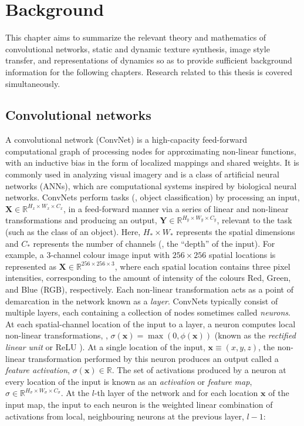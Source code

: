 \chapter{Background}\label{chap:background}

This chapter aims to summarize the relevant theory and mathematics of
convolutional networks,
static and dynamic texture synthesis, image style transfer, and representations of dynamics so as to provide sufficient
background information for the following chapters. Research
related to this thesis is covered simultaneously.

\section{Convolutional networks}

A convolutional network (ConvNet) is a high-capacity feed-forward computational graph of processing nodes for approximating non-linear functions, with an inductive bias in the form of localized mappings and shared weights. It is commonly used in analyzing visual imagery and is a class of artificial neural networks (ANNs), which are computational systems inspired by biological neural networks. ConvNets perform tasks (\eg, object classification) by processing an input, $\mathbf{X} \in \mathbb{R}^{H_x \times W_x \times C_x}$, in a feed-forward manner via a series of linear and non-linear transformations and producing an output, $\mathbf{Y} \in \mathbb{R}^{H_y \times W_y \times C_y}$, relevant to the task (such as the class of an object). Here, $H_\ast \times W_\ast$ represents the spatial dimensions and $C_\ast$ represents the number of channels (\ie, the ``depth'' of the input). For example, a $3$-channel colour image input with $256 \times 256$ spatial locations is represented as $\mathbf{X} \in \mathbb{R}^{256 \times 256 \times 3}$, where each spatial location contains three pixel intensities, corresponding to the amount of intensity of the colours Red, Green, and Blue (RGB), respectively. Each non-linear transformation acts as a point of demarcation in the network known as a \emph{layer}. ConvNets typically consist of multiple layers, each containing a collection of nodes sometimes called \emph{neurons}. At each spatial-channel location of the input to a layer, a neuron computes local non-linear transformations, \eg, $\sigma(\mathbf{x}) = \max{(0, \phi(\mathbf{x}))}$ (known as the \emph{rectified linear unit} or ReLU \cite{nair2010rectified}). At a single location of the input, $\mathbf{x} \equiv (x, y, z)$, the non-linear transformation performed by this neuron produces an output called a \emph{feature activation}, $\sigma(\mathbf{x}) \in \mathbb{R}$. The set of activations produced by a neuron at every location of the input is known as an \emph{activation} or \emph{feature map}, $\sigma \in \mathbb{R}^{H_\sigma \times W_\sigma \times C_\sigma}$. At the $l$-th layer of the network and for each location $\mathbf{x}$ of the input map, the input to each neuron is the weighted linear combination of activations from local, neighbouring neurons at the previous layer, $l-1$:
